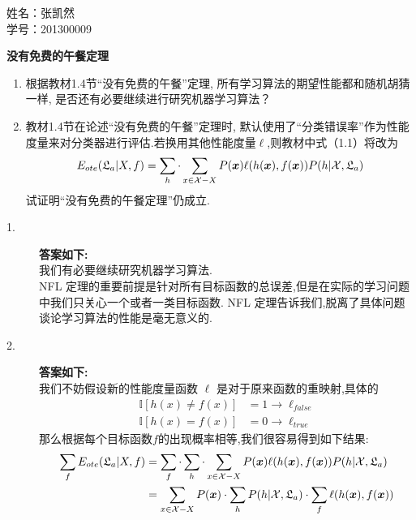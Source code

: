 \documentclass[answers]{exam}  %
\begin{document}
\Large
\noindent
姓名：张凯然 \\
学号：201300009 \\
\begin{questions}
	\question [20] \textbf{没有免费的午餐定理}

	\begin{enumerate}
		\item 根据教材1.4节“没有免费的午餐”定理, 所有学习算法的期望性能都和随机胡猜一样, 是否还有必要继续进行研究机器学习算法？
		\item 教材1.4节在论述“没有免费的午餐”定理时, 默认使用了“分类错误率”作为性能度量来对分类器进行评估.若换用其他性能度量$\ell$,则教材中式（1.1）将改为
		      \begin{equation}
			      E_{ote}(\mathfrak{L}_a|X,f)=\sum_h \cdot\sum_{x\in\mathcal{X}-X}P({\boldsymbol{x}})\ell(h({\boldsymbol{x}}),f({\boldsymbol{x}}))P(h|\mathcal{X},\mathfrak{L}_a)
		      \end{equation}
		      试证明“没有免费的午餐定理”仍成立.
	\end{enumerate}
	\begin{solution}
		\begin{description}
			\item[1.] \textbf{答案如下:}\\
			      我们有必要继续研究机器学习算法.\\
			      NFL 定理的重要前提是针对所有目标函数的总误差,但是在实际的学习问题中我们只关心一个或者一类目标函数. NFL 定理告诉我们,脱离了具体问题谈论学习算法的性能是毫无意义的.
			\item[2.] \textbf{答案如下:}\\
			      我们不妨假设新的性能度量函数 $\ell$ 是对于原来函数的重映射,具体的
			      \begin{align*}
				      \mathbb I\left[ h(x)\neq f(x) \right] & = 1 \to \ell_{false} \\
				      \mathbb I\left[ h(x)=f(x) \right]     & = 0 \to \ell_{true}
			      \end{align*}
			      那么根据每个目标函数$f$的出现概率相等,我们很容易得到如下结果:
			      \begin{align*}
				      \sum_f E_{ote}(\mathfrak{L}_a|X,f) & =\sum_f\cdot\sum_h \cdot\sum_{x\in\mathcal{X}-X}P(\vx)\ell(h(\vx),f(\vx))P(h|\mathcal{X},\mathfrak{L}_a)                                                                     \\
				                                         & = \sum_{x\in\mathcal{X}-X}P(\vx)\cdot\sum_h P(h|\mathcal{X},\mathfrak{L}_a)\cdot\sum_f\ell(h(\vx),f(\vx))                                                                    \\

\end{align*}
\end{description}
\end{solution}
\end{questions}
\end{document}
